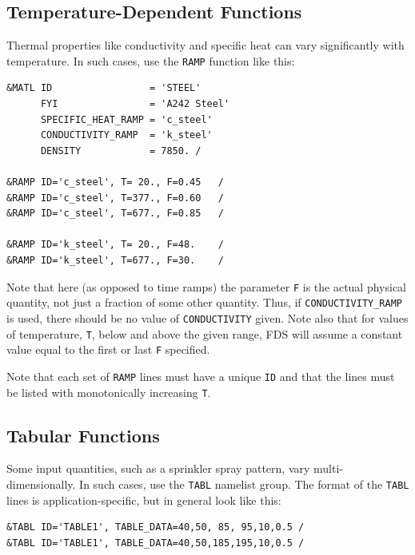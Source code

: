 \documentclass[11pt]{book}
\newcommand{\ct}{\tt\small}
\begin{document}
\subsection{Temperature-Dependent Functions}

Thermal properties like conductivity and specific heat can vary significantly with temperature. In such cases, use
the {\ct RAMP} function like this:

\footnotesize
\begin{verbatim}
&MATL ID                 = 'STEEL'
      FYI                = 'A242 Steel'
      SPECIFIC_HEAT_RAMP = 'c_steel'
      CONDUCTIVITY_RAMP  = 'k_steel'
      DENSITY            = 7850. /

&RAMP ID='c_steel', T= 20., F=0.45   /
&RAMP ID='c_steel', T=377., F=0.60   /
&RAMP ID='c_steel', T=677., F=0.85   /

&RAMP ID='k_steel', T= 20., F=48.    /
&RAMP ID='k_steel', T=677., F=30.    /
\end{verbatim}
\normalsize

\noindent
Note that here (as opposed to time ramps) the parameter {\ct F} is the actual physical quantity, not just
a fraction of some other quantity. Thus, if {\ct CONDUCTIVITY\_RAMP} is used, there should be no
value of {\ct CONDUCTIVITY} given. Note also that for values of temperature, {\ct T}, below and above the
given range, FDS will assume a constant value equal to the first or last {\ct F} specified.

\begin{warning}
\noindent
Note that each set of {\ct RAMP} lines must have a unique {\ct ID} and that the lines must
be listed with monotonically increasing {\ct T}.
\end{warning}



\subsection{Tabular Functions}

Some input quantities, such as a sprinkler spray pattern, vary multi-dimensionally. In such cases, use
the {\ct TABL} namelist group. The format of the {\ct TABL} lines is application-specific, but in general look like this:

\footnotesize
\begin{verbatim}
&TABL ID='TABLE1', TABLE_DATA=40,50, 85, 95,10,0.5 /
&TABL ID='TABLE1', TABLE_DATA=40,50,185,195,10,0.5 /
\end{verbatim}
\normalsize
\end{document}
